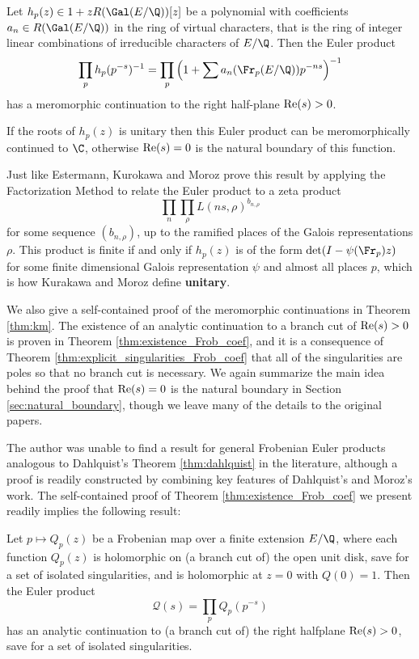 \documentclass[12pt]{amsart}
\theoremstyle{plain}
\begin{document}
\begin{theorem}\label{thm:km}
    Let $h_p(z) \in 1 + z R(\Gal(E/\Q))[z]$ be a polynomial with coefficients $a_n\in R(\Gal(E/\Q))$ in the ring of virtual characters, that is the ring of integer linear combinations of irreducible characters of $E/\Q$. Then the Euler product
    \[
    \prod_p h_p(p^{-s})^{-1} = \prod_p \left(1 + \sum a_n(\Fr_p(E/\Q)) p^{-ns}\right)^{-1}
    \]
    has a meromorphic continuation to the right half-plane ${\rm Re}(s)>0$.

    If the roots of $h_p(z)$ is unitary then this Euler product can be meromorphically continued to $\C$, otherwise ${\rm Re}(s) = 0$ is the natural boundary of this function.
\end{theorem}

Just like Estermann, Kurokawa and Moroz prove this result by applying the Factorization Method to relate the Euler product to a zeta product
\[
    \prod_n \prod_\rho L(ns,\rho)^{b_{n,\rho}}
\]
for some sequence $(b_{n,\rho})$, up to the ramified places of the Galois representations $\rho$. This product is finite if and only if $h_p(z)$ is of the form $\det(I - \psi(\Fr_p)z)$ for some finite dimensional Galois representation $\psi$ and almost all places $p$, which is how Kurakawa and Moroz define \textbf{unitary}.

We also give a self-contained proof of the meromorphic continuations in Theorem \ref{thm:km}. The existence of an analytic continuation to a branch cut of ${\rm Re}(s) > 0$ is proven in Theorem \ref{thm:existence_Frob_coef}, and it is a consequence of Theorem \ref{thm:explicit_singularities_Frob_coef} that all of the singularities are poles so that no branch cut is necessary. We again summarize the main idea behind the proof that ${\rm Re}(s)=0$ is the natural boundary in Section \ref{sec:natural_boundary}, though we leave many of the details to the original papers.

The author was unable to find a result for general Frobenian Euler products analogous to Dahlquist's Theorem \ref{thm:dahlquist} in the literature, although a proof is readily constructed by combining key features of Dahlquist's and Moroz's work. The self-contained proof of Theorem \ref{thm:existence_Frob_coef} we present readily implies the following result:

\begin{theorem}\label{thm:frob_dahlquist}
    Let $p\mapsto Q_p(z)$ be a Frobenian map over a finite extension $E/\Q$, where each function $Q_p(z)$ is holomorphic on (a branch cut of) the open unit disk, save for a set of isolated singularities, and is holomorphic at $z=0$ with $Q(0)=1$. Then the Euler product
    \[
    \mathcal{Q}(s) = \prod_p Q_p(p^{-s})
    \]
    has an analytic continuation to (a branch cut of) the right halfplane ${\rm Re}(s) > 0$, save for a set of isolated singularities.
\end{theorem}
\end{document}
